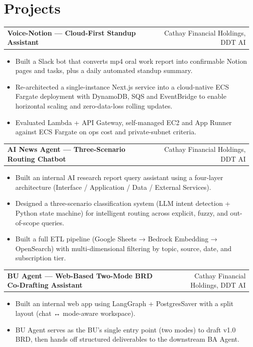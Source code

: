 \documentclass[11pt,a4paper]{article}
\makeatletter
\newcommand{\arrowright}{{\symbolfont →}}
\newcommand{\arrowboth}{{\symbolfont ↔}}
\newcommand{\arrowright}{\ensuremath{\rightarrow}}
\newcommand{\arrowboth}{\ensuremath{\leftrightarrow}}
\newcommand{\entryhead}[2]{%
  \begin{tabularx}{\linewidth}{@{}Xr@{}}
    \textbf{\fontsize{10.5pt}{13pt}\selectfont #1} &
    {\color{inkmuted}\fontsize{9.5pt}{12pt}\selectfont #2}
  \end{tabularx}%
}
\makeatother
\begin{document}
\section{Projects}
\entryhead{Voice-Notion — Cloud-First Standup Assistant}{Cathay Financial Holdings, DDT AI}
\begin{itemize}
  \item Built a Slack bot that converts mp4 oral work report into confirmable Notion pages and tasks, plus a daily automated standup summary.
  \item Re-architected a single-instance Next.js service into a cloud-native ECS Fargate deployment with DynamoDB, SQS and EventBridge to enable horizontal scaling and zero-data-loss rolling updates.
  \item Evaluated Lambda + API Gateway, self-managed EC2 and App Runner against ECS Fargate on ops cost and private-subnet criteria.
\end{itemize}
\vspace{2.6mm}\entryhead{AI News Agent — Three-Scenario Routing Chatbot}{Cathay Financial Holdings, DDT AI}
\begin{itemize}
  \item Built an internal AI research report query assistant using a four-layer architecture (Interface / Application / Data / External Services).
  \item Designed a three-scenario classification system (LLM intent detection + Python state machine) for intelligent routing across explicit, fuzzy, and out-of-scope queries.
  \item Built a full ETL pipeline (Google Sheets \arrowright{} Bedrock Embedding \arrowright{} OpenSearch) with multi-dimensional filtering by topic, source, date, and subscription tier.
\end{itemize}
\vspace{2.6mm}\entryhead{BU Agent — Web-Based Two-Mode BRD Co-Drafting Assistant}{Cathay Financial Holdings, DDT AI}
\begin{itemize}
  \item Built an internal web app using LangGraph + PostgresSaver with a split layout (chat \arrowboth{} mode-aware workspace).
  \item BU Agent serves as the BU's single entry point (two modes) to draft v1.0 BRD, then hands off structured deliverables to the downstream BA Agent.
\end{itemize}
\end{document}
